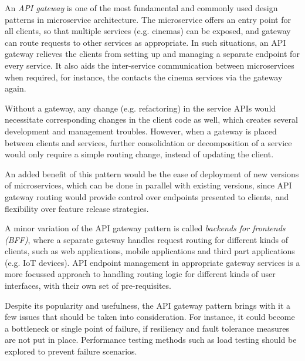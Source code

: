 An \textit{API gateway} is one of the most fundamental and commonly used design patterns in microservice architecture. The  microservice offers an entry point for all clients, so that multiple services (e.g. cinemas) can be exposed, and gateway can route requests to other services as appropriate. In such situations, an API gateway relieves the clients from setting up and managing a separate endpoint for every service. It also aids the inter-service communication between microservices when required, for instance, the  contacts the cinema services via the gateway again.

Without a gateway, any change (e.g. refactoring) in the service APIs would necessitate corresponding changes in the client code as well, which creates several development and management troubles. However, when a gateway is placed between clients and services, further consolidation or decomposition of a service would only require a simple routing change, instead of updating the client.

An added benefit of this pattern would be the ease of deployment of new versions of microservices, which can be done in parallel with existing versions, since API gateway routing would provide control over endpoints presented to clients, and flexibility over feature release strategies.

A minor variation of the API gateway pattern is called \textit{backends for frontends (BFF)}, where a separate gateway handles request routing for different kinds of clients, such as web applications, mobile applications and third part applications (e.g. IoT devices). API endpoint management in appropriate gateway services is a more focussed approach to handling routing logic for different kinds of user interfaces, with their own set of pre-requisites.

Despite its popularity and usefulness, the API gateway pattern brings with it a few issues that should be taken into consideration. For instance, it could become a bottleneck or single point of failure, if resiliency and fault tolerance measures are not put in place. Performance testing methods such as load testing should be explored to prevent failure scenarios.

